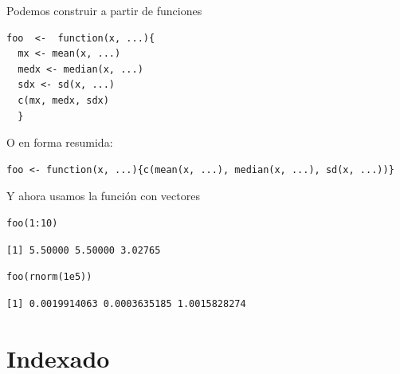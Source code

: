 \documentclass[xcolor={usenames,svgnames,dvipsnames}]{beamer}
\begin{document}
\begin{frame}[fragile,label=sec-2-5-2]{Podemos construir a partir de funciones}
 \lstset{language=R,label= ,caption= ,numbers=none}
\begin{lstlisting}
foo  <-  function(x, ...){
  mx <- mean(x, ...)
  medx <- median(x, ...)
  sdx <- sd(x, ...)
  c(mx, medx, sdx)
  }
\end{lstlisting}

O en forma resumida:
\lstset{language=R,label= ,caption= ,numbers=none}
\begin{lstlisting}
foo <- function(x, ...){c(mean(x, ...), median(x, ...), sd(x, ...))}
\end{lstlisting}
\end{frame}


\begin{frame}[fragile,label=sec-2-5-3]{Y ahora usamos la función con vectores}
 \lstset{language=R,label= ,caption= ,numbers=none}
\begin{lstlisting}
foo(1:10)
\end{lstlisting}

\begin{verbatim}
[1] 5.50000 5.50000 3.02765
\end{verbatim}

\lstset{language=R,label= ,caption= ,numbers=none}
\begin{lstlisting}
foo(rnorm(1e5))
\end{lstlisting}

\begin{verbatim}
[1] 0.0019914063 0.0003635185 1.0015828274
\end{verbatim}
\end{frame}

\section{Indexado}
\label{sec-3}
\end{document}
